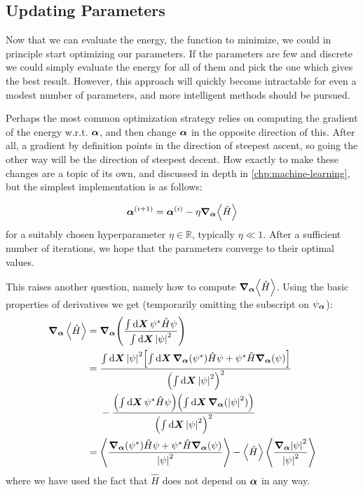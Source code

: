 \documentclass[Thesis.tex]{subfiles}
\begin{document}
\subsection{Updating Parameters}

Now that we can evaluate the energy, the function to minimize, we could in
principle start optimizing our parameters. If the parameters are few and
discrete we could simply evaluate the energy for all of them and pick the one
which gives the best result. However, this approach will quickly become
intractable for even a modest number of parameters, and more intelligent
methods should be pursued.

Perhaps the most common optimization strategy relies on computing the gradient
of the energy w.r.t. $\bm{\alpha}$, and then change $\bm{\alpha}$ in the opposite
direction of this. After all, a gradient by definition points in the direction
of steepest ascent, so going the other way will be the direction of steepest
decent. How exactly to make these changes are a topic of its own, and discussed in depth in \autoref{chp:machine-learning}, but the simplest implementation is as follows:

\begin{align}
    \bm{\alpha}^{(i+1)} = \bm{\alpha}^{(i)} - \eta \grad_{\bm{\alpha}}{\expval{\hat H}}
\end{align}
for a suitably chosen hyperparameter $\eta\in\mathbb{R}$, typically $\eta\ll 1$. After a sufficient number of iterations, we hope that the parameters converge to their optimal values.

This raises another question, namely how to compute
$\grad_{\bm{\alpha}}{\expval{\hat H}}$. Using the basic properties of derivatives we get (temporarily omitting the subscript on $\psi_{\bm{\alpha}}$):
\begin{align}
    \grad_{\bm{\alpha}}\expval{\hat H} &= \grad_{\bm{\alpha}}\qty( \frac{\int\dd{\bm{X}}\psi^*\hat H\psi}{\int\dd{\bm{X}}\abs{\psi}^2})\\
    &= \frac{\int\dd{\bm{X}} \abs{\psi}^2 \qty[ \int\dd{\bm{X}}
    \grad_{\bm{\alpha}}(\psi^*)\hat H\psi +
    \psi^*\hat H\grad_{\bm{\alpha}}(\psi)
    ]}{\qty(\int\dd{\bm{X}}\abs{\psi}^2)^2}\\
    &\quad{ }\ -
    \frac{\qty(\int\dd{\bm{X}}\psi^*\hat
    H\psi)\qty(\int\dd{\bm{X}}\grad_{\bm{\alpha}}(\abs{\psi}^2))}{\qty(\int\dd{\bm{X}}\abs{\psi}^2)^2} \\
    &= \expval{\frac{\grad_{\bm{\alpha}}(\psi^*)\hat H\psi + \psi^*\hat H\grad_{\bm{\alpha}}(\psi)}{\abs{\psi}^2}}
    - \expval{\hat H}\expval{\frac{\grad_{\bm{\alpha}}\abs{\psi}^2}{\abs{\psi}^2}}
\end{align}
where we have used the fact that $\hat H$ does not depend on $\bm{\alpha}$ in any way.
\end{document}
